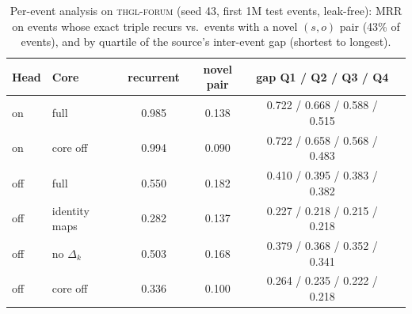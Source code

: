 \begin{table}[h]
\centering\small
\caption{Per-event analysis on \textsc{thgl-forum} (seed 43, first 1M test
events, leak-free): MRR on events whose exact triple recurs vs.\ events with
a novel $(s,o)$ pair (43\% of events), and by quartile of the source's
inter-event gap (shortest to longest).}
\label{tab:stratified}
\begin{tabular}{llcccc}
\toprule
Head & Core & recurrent & novel pair & gap Q1 / Q2 / Q3 / Q4 \\
\midrule
on & full & 0.985 & 0.138 & 0.722 / 0.668 / 0.588 / 0.515 \\
on & core off & 0.994 & 0.090 & 0.722 / 0.658 / 0.568 / 0.483 \\
off & full & 0.550 & 0.182 & 0.410 / 0.395 / 0.383 / 0.382 \\
off & identity maps & 0.282 & 0.137 & 0.227 / 0.218 / 0.215 / 0.218 \\
off & no $\Delta_k$ & 0.503 & 0.168 & 0.379 / 0.368 / 0.352 / 0.341 \\
off & core off & 0.336 & 0.100 & 0.264 / 0.235 / 0.222 / 0.218 \\
\bottomrule
\end{tabular}
\end{table}

